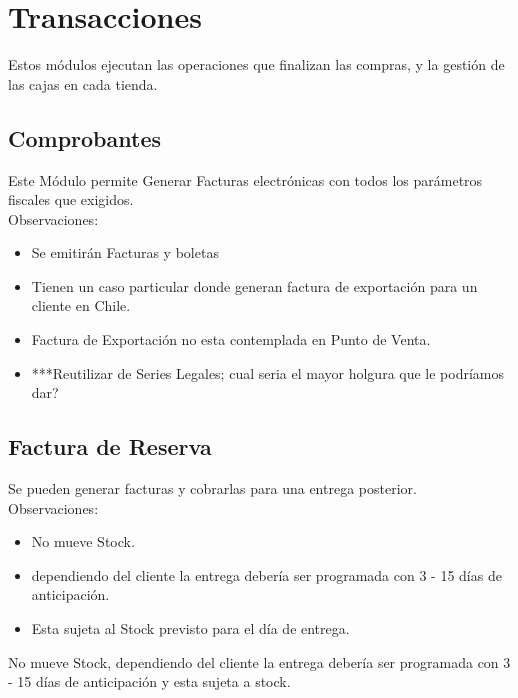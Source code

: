 \documentclass[pdftex,12pt,oneside,a4paper,spanish, english, brazil]{abntex2}
\begin{document}
\begin{sloppypar}
              \section{Transacciones}
              Estos módulos ejecutan las operaciones que finalizan las compras, y la gestión de las cajas en cada tienda.
              \subsection{Comprobantes}
              Este Módulo permite Generar Facturas electrónicas con todos los parámetros fiscales que exigidos.\\
              Observaciones:
              \begin{itemize}
              	\item Se emitirán Facturas y boletas
              	\item Tienen un caso particular donde generan factura de exportación para un cliente en Chile.
              	\item Factura de Exportación no esta contemplada en Punto de Venta.
              	\item ***Reutilizar de Series Legales; cual seria el mayor holgura que le podríamos dar?
              \end{itemize}
              \subsection{Factura de Reserva}
              Se pueden generar facturas y cobrarlas para una entrega posterior.\\
              Observaciones:
              \begin{itemize}
              	\item No mueve Stock.
              	\item dependiendo del cliente la entrega debería ser programada con 3 - 15 días de anticipación.
              	\item Esta sujeta al Stock previsto para el día de entrega.
              \end{itemize}
              No mueve Stock, dependiendo del cliente la entrega debería ser programada con 3 - 15 días de anticipación y esta sujeta a stock.

\end{sloppypar}
\end{document}
